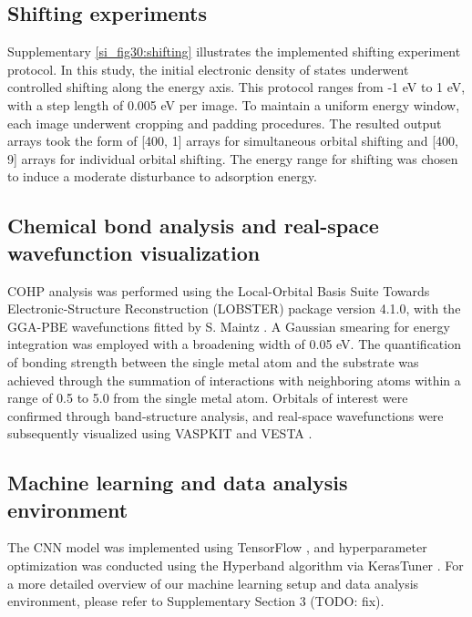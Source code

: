 \subsection{Shifting experiments}
Supplementary \cref{si_fig30:shifting} illustrates the implemented shifting experiment protocol.
In this study, the initial electronic density of states underwent controlled shifting along the energy axis.
This protocol ranges from -1 eV to 1 eV, with a step length of 0.005 eV per image.
To maintain a uniform energy window, each image underwent cropping and padding procedures.
The resulted output arrays took the form of [400, 1] arrays for simultaneous orbital shifting and [400, 9] arrays for individual orbital shifting.
The energy range for shifting was chosen to induce a moderate disturbance to adsorption energy.


\subsection{Chemical bond analysis and real-space wavefunction visualization}
COHP analysis was performed using the Local-Orbital Basis Suite Towards Electronic-Structure Reconstruction (LOBSTER) package  \cite{deringer2011crystal, koga1999analytical, nelson2020lobster, maintz2013analytic, dronskowski1993crystal} version 4.1.0, with the GGA-PBE wavefunctions fitted by S. Maintz \cite{koga1999analytical, maintz2016lobster}.
A Gaussian smearing for energy integration was employed with a broadening width of 0.05 eV.
The quantification of bonding strength between the single metal atom and the substrate was achieved through the summation of interactions with neighboring atoms within a range of 0.5 \text{\AA} to 5.0 \text{\AA} from the single metal atom.
Orbitals of interest were confirmed through band-structure analysis, and real-space wavefunctions were subsequently visualized using VASPKIT \cite{wang2021vaspkit} and VESTA \cite{momma2008vesta}.


\subsection{Machine learning and data analysis environment}
The CNN model was implemented using TensorFlow \cite{abadi2016tensorflow}, and hyperparameter optimization was conducted using the Hyperband \cite{li2018hyperband} algorithm via KerasTuner \cite{omalley2019kerastuner}.
For a more detailed overview of our machine learning setup and data analysis environment, please refer to Supplementary Section 3 (TODO: fix).
